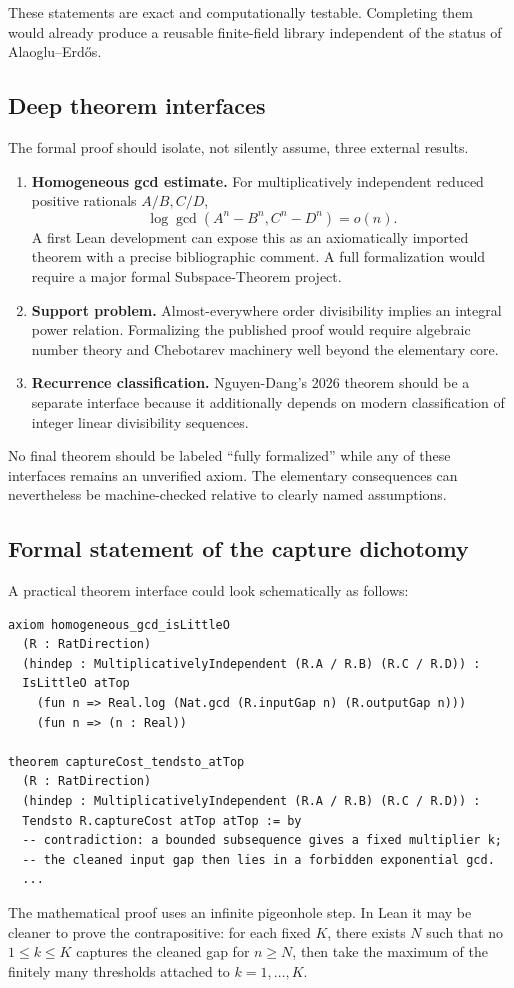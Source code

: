 \documentclass[11pt,oneside]{article}
\theoremstyle{definition}
\theoremstyle{remark}
\newcommand{\AEconj}{Alaoglu--Erd\H{o}s}
\begin{document}
These statements are exact and computationally testable.  Completing them would already
produce a reusable finite-field library independent of the status of \AEconj{}.

\subsection{Deep theorem interfaces}

The formal proof should isolate, not silently assume, three external results.

\begin{enumerate}[label=\textbf{E\arabic*.}]
\item \textbf{Homogeneous gcd estimate.}  For multiplicatively independent reduced positive
rationals $A/B,C/D$,
\[
 \log\gcd(A^n-B^n,C^n-D^n)=o(n).
\]
A first Lean development can expose this as an axiomatically imported theorem with a precise
bibliographic comment.  A full formalization would require a major formal Subspace-Theorem
project.
\item \textbf{Support problem.}  Almost-everywhere order divisibility implies an integral
power relation.  Formalizing the published proof would require algebraic number theory and
Chebotarev machinery well beyond the elementary core.
\item \textbf{Recurrence classification.}  Nguyen-Dang's 2026 theorem should be a separate
interface because it additionally depends on modern classification of integer linear
divisibility sequences.
\end{enumerate}

No final theorem should be labeled ``fully formalized'' while any of these interfaces remains
an unverified axiom.  The elementary consequences can nevertheless be machine-checked
relative to clearly named assumptions.

\subsection{Formal statement of the capture dichotomy}

A practical theorem interface could look schematically as follows:
\begin{lstlisting}[style=pythonstyle,language={},caption={Lean-style pseudocode for the main conditional theorem.}]
axiom homogeneous_gcd_isLittleO
  (R : RatDirection)
  (hindep : MultiplicativelyIndependent (R.A / R.B) (R.C / R.D)) :
  IsLittleO atTop
    (fun n => Real.log (Nat.gcd (R.inputGap n) (R.outputGap n)))
    (fun n => (n : Real))

theorem captureCost_tendsto_atTop
  (R : RatDirection)
  (hindep : MultiplicativelyIndependent (R.A / R.B) (R.C / R.D)) :
  Tendsto R.captureCost atTop atTop := by
  -- contradiction: a bounded subsequence gives a fixed multiplier k;
  -- the cleaned input gap then lies in a forbidden exponential gcd.
  ...
\end{lstlisting}
The mathematical proof uses an infinite pigeonhole step.  In Lean it may be cleaner to prove
the contrapositive: for each fixed $K$, there exists $N$ such that no $1\le k\le K$ captures
the cleaned gap for $n\ge N$, then take the maximum of the finitely many thresholds attached
to $k=1,\dots,K$.
\end{document}
